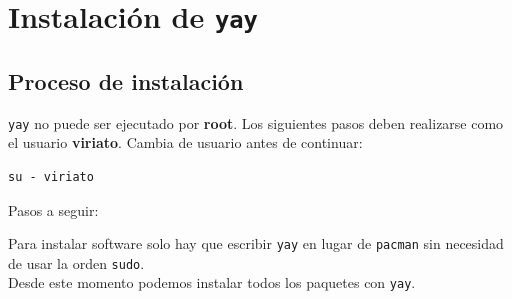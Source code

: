 \section{Instalación de {\color{brown}\texttt{yay}}}
\subsection{Proceso de instalación}

\begin{tcolorbox}[colback=red!5, colframe=red!70!black, title={\color{red}\textbf{Precaución:}}]
  \texttt{yay} no puede ser ejecutado por \textbf{root}. Los siguientes pasos deben
  realizarse como el usuario \textbf{viriato}. Cambia de usuario antes de continuar:
  \begin{lstlisting}[style=bashstyle]
su - viriato
  \end{lstlisting}
\end{tcolorbox}

\vspace{3mm}
	\begin{center}
		{\color{blue}Pasos a seguir:}\vspace{3mm}

      \begin{tcolorbox}[title=Descargamos los ficheros desde el repositorio \textbf{AUR}:]
      \end{tcolorbox}

      \begin{tcolorbox}[title=Ahora vamos al directorio y compilamos:]
			\vspace{1mm}

      \end{tcolorbox}

		Para instalar software solo hay que escribir {\color{red}\texttt{yay}} en lugar de {\color{red}\texttt{pacman}} sin necesidad de usar la orden {\color{red}\texttt{sudo}}.\\[3mm]
		Desde este momento podemos instalar todos los paquetes con {\color{red}\texttt{yay}}.
		\end{center}
